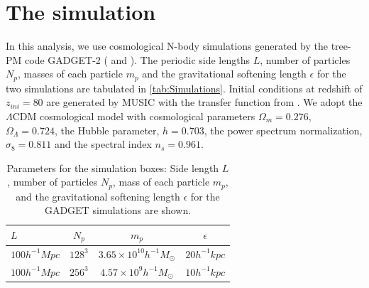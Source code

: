 \section{The simulation}
\label{sec:simulation}

In this analysis, we use cosmological N-body simulations generated by the tree-PM code {GADGET-2}    (\citealt{Springel2005c} and \citealt{Springel2001}). 
The periodic side lengths $L$, number of particles $N_p$, masses of each particle $m_p$ and the gravitational softening length $\epsilon$ for the two simulations are tabulated in \autoref{tab:Simulations}. Initial conditions at redshift of $z_{ini}= 80$ are generated by {MUSIC} \citep{Hahn2011a} with the transfer function from \cite{Eisenstein1998a}. We adopt the $\Lambda$CDM cosmological model with cosmological parameters $\Omega_{m}= 0.276$, $\Omega_{\Lambda}= 0.724$, the Hubble parameter, $h = 0.703$, the power spectrum normalization, $\sigma_8 = 0.811$ and the spectral index $n_s= 0.961$. 

\begin{table}
\centering
  \caption{Parameters for the simulation boxes: Side length $L$, number of particles $N_p$, mass of each particle $m_p$, and the gravitational softening length $\epsilon$ for the GADGET simulations are shown.}
\begin{tabular}{|l|c|c|c| }
\hline
$L$ & $N_p$ & $m_p$ & $\epsilon$  \\  \hline
$100 h^{-1} Mpc$ & $128^3$      & $ 3.65 \times 10^{10} h^{-1} M_{\odot}$  & $20 h^{-1} kpc$\\ \hline
$100 h^{-1} Mpc$ & $256^3$      & $ 4.57 \times 10^{9} h^{-1} M_{\odot}$  & $10 h^{-1} kpc$ \\ \hline

\end{tabular}
\label{tab:Simulations}
\end{table}

